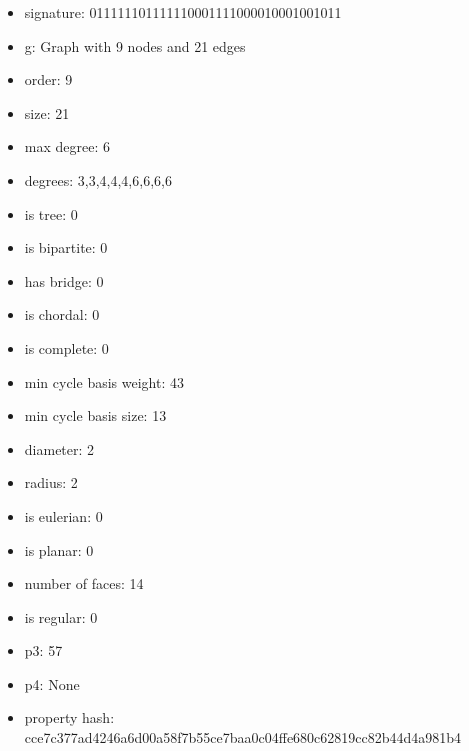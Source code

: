 \newpage
\begin{figure}
\end{figure}
\begin{itemize}
\item signature: 011111101111110001111000010001001011
\item g: Graph with 9 nodes and 21 edges
\item order: 9
\item size: 21
\item max degree: 6
\item degrees: 3,3,4,4,4,6,6,6,6
\item is tree: 0
\item is bipartite: 0
\item has bridge: 0
\item is chordal: 0
\item is complete: 0
\item min cycle basis weight: 43
\item min cycle basis size: 13
\item diameter: 2
\item radius: 2
\item is eulerian: 0
\item is planar: 0
\item number of faces: 14
\item is regular: 0
\item p3: 57
\item p4: None
\item property hash: cce7c377ad4246a6d00a58f7b55ce7baa0c04ffe680c62819cc82b44d4a981b4
\end{itemize}
